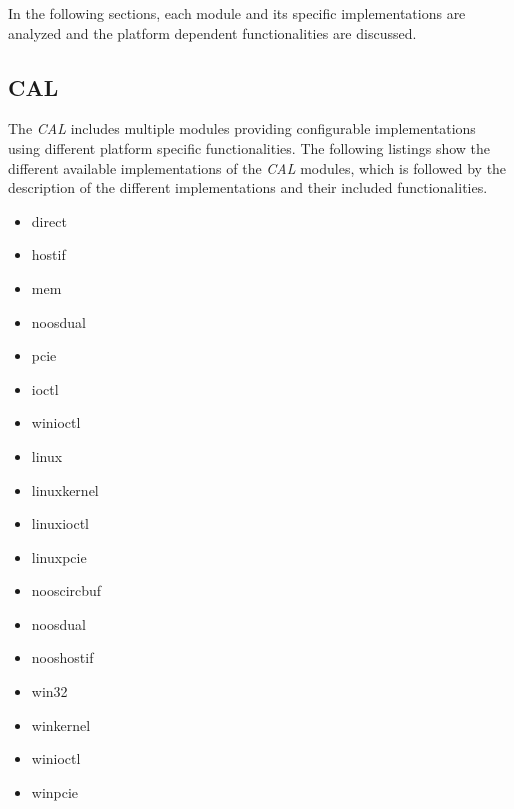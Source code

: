 In the following sections, each module and its specific implementations are analyzed and the platform dependent functionalities are discussed.

\subsection{CAL}
\label{sec:oplk_platform_cal}

The \emph{CAL} includes multiple modules providing configurable implementations using different platform specific functionalities.
The following listings show the different available implementations of the \emph{CAL} modules, which is followed by the description of the different implementations and their included functionalities.
\\
    
\begin{description}[leftmargin=0cm]
    \item[control module] \mbox{}
    \begin{multicols}{3}
        \begin{itemize}
            \item direct
            \item hostif
            \item mem
            \item noosdual
            \item pcie
            \item ioctl
            \item winioctl
        \end{itemize}
    \end{multicols}
    
    \item[event handler] \mbox{}
    \begin{multicols}{3}
        \begin{itemize}
            \item linux
            \item linuxkernel
            \item linuxioctl
            \item linuxpcie
            \item nooscircbuf
            \item noosdual
            \item nooshostif
            \item win32
            \item winkernel
            \item winioctl
            \item winpcie
        \end{itemize}
    \end{multicols}
    

\end{description}
